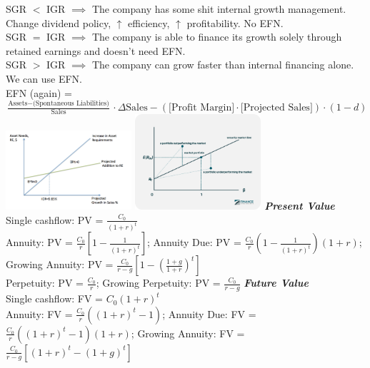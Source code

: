 \documentclass{letter}
\newcommand{\textib}[1]{\textit{\textbf{{#1}}}}
\begin{document}
SGR $<$ IGR $\implies$ The company has some shit internal growth management. Change dividend policy, $\uparrow$ efficiency, $\uparrow$ profitability. No EFN. \\
SGR $=$ IGR $\implies$ The company is able to finance its growth solely through retained earnings and doesn't need EFN. \\
SGR $>$ IGR $\implies$ The company can grow faster than internal financing alone. We can use EFN. \\
EFN (again) = $\frac{\text{Assets} - \text{(Spontaneous Liabilities)}}{\text{Sales}} \cdot \Delta \text{Sales} - (\text{[Profit Margin]} \cdot \text{[Projected Sales]}) \cdot (1 - d)$
\newline
\includegraphics[width=0.35\textwidth]{./efn.png}
\includegraphics[width=0.35\textwidth]{./capm.png}
\newline
\textib{Present Value} \\
Single cashflow: PV = $\frac{C_0}{(1 + r)^{t}}$ \\
Annuity: PV = $\frac{C_0}{r}\left[1 - \frac{1}{(1 + r)^{t}}\right]$; 
Annuity Due: PV = $\frac{C_0}{r}\left(1 - \frac{1}{(1 + r)^{t}}\right)\left(1 + r\right)$; 
Growing Annuity: PV = $\frac{C_0}{r - g}\left[1 - \left(\frac{1 + g}{1 + r}\right)^t\right]$ \\
Perpetuity: PV = $\frac{C_0}{r}$;
Growing Perpetuity: PV = $\frac{C_0}{r - g}$
\newline
\textib{Future Value} \\
Single cashflow: FV = $C_0 \left(1 + r\right)^{t}$ \\
Annuity: FV = $\frac{C_0}{r} \left(\left(1 + r\right)^{t} - 1\right)$; 
Annuity Due: FV = $\frac{C_0}{r} \left(\left(1 + r\right)^{t} - 1\right)\left(1 + r\right)$;
Growing Annuity: FV = $\frac{C_0}{r - g} \left[\left(1 + r\right)^{t} - \left(1 + g\right)^{t}\right]$ \\
\end{document}

